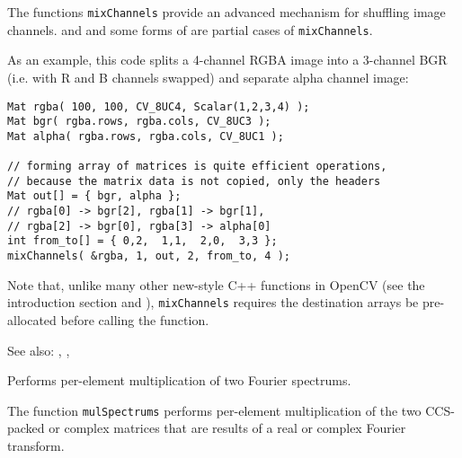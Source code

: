 The functions \texttt{mixChannels} provide an advanced mechanism for shuffling image channels.  and  and some forms of  are partial cases of \texttt{mixChannels}.

As an example, this code splits a 4-channel RGBA image into a 3-channel
BGR (i.e. with R and B channels swapped) and separate alpha channel image:

\begin{lstlisting}
Mat rgba( 100, 100, CV_8UC4, Scalar(1,2,3,4) );
Mat bgr( rgba.rows, rgba.cols, CV_8UC3 );
Mat alpha( rgba.rows, rgba.cols, CV_8UC1 );

// forming array of matrices is quite efficient operations,
// because the matrix data is not copied, only the headers
Mat out[] = { bgr, alpha };
// rgba[0] -> bgr[2], rgba[1] -> bgr[1],
// rgba[2] -> bgr[0], rgba[3] -> alpha[0]
int from_to[] = { 0,2,  1,1,  2,0,  3,3 };
mixChannels( &rgba, 1, out, 2, from_to, 4 );
\end{lstlisting}

Note that, unlike many other new-style C++ functions in OpenCV (see the introduction section and ),
\texttt{mixChannels} requires the destination arrays be pre-allocated before calling the function.

See also: , ,  


Performs per-element multiplication of two Fourier spectrums.

\begin{description}
\end{description}

The function \texttt{mulSpectrums} performs per-element multiplication of the two CCS-packed or complex matrices that are results of a real or complex Fourier transform.

